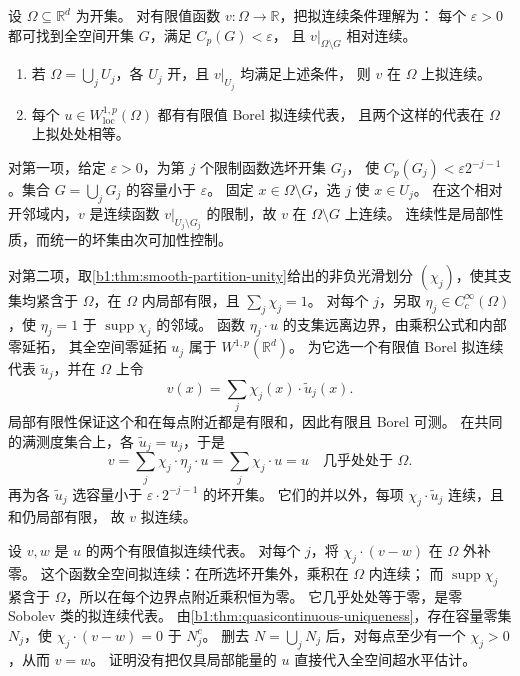 \begin{exercise}\label{b1:ex:26-local-quasicontinuous-gluing}
设 \(\Omega\subseteq\mathbb R^d\) 为开集。
对有限值函数 \(v\colon\Omega\rightarrow\mathbb R\)，把拟连续条件理解为：
每个 \(\varepsilon>0\) 都可找到全空间开集 \(G\)，满足 \(C_p(G)<\varepsilon\)，
且 \(v|_{\Omega\setminus G}\) 相对连续。
\begin{enumerate}
 \item\label{b1:item:26-local-quasicontinuous-cover}
 若 \(\Omega=\bigcup_jU_j\)，各 \(U_j\) 开，且 \(v|_{U_j}\) 均满足上述条件，
 则 \(v\) 在 \(\Omega\) 上拟连续。
 \item\label{b1:item:26-local-quasicontinuous-sobolev}
 每个 \(u\in W_{\mathrm{loc}}^{1,p}(\Omega)\) 都有有限值 Borel 拟连续代表，
 且两个这样的代表在 \(\Omega\) 上拟处处相等。
\end{enumerate}
\end{exercise}
\begin{solution}
对第一项，给定 \(\varepsilon>0\)，为第 \(j\) 个限制函数选坏开集 \(G_j\)，
使 \(C_p(G_j)<\varepsilon2^{-j-1}\)。集合 \(G=\bigcup_jG_j\) 的容量小于 \(\varepsilon\)。
固定 \(x\in\Omega\setminus G\)，选 \(j\) 使 \(x\in U_j\)。
在这个相对开邻域内，\(v\) 是连续函数
\(v|_{U_j\setminus G_j}\) 的限制，故 \(v\) 在 \(\Omega\setminus G\) 上连续。
连续性是局部性质，而统一的坏集由次可加性控制。

对第二项，取\cref{b1:thm:smooth-partition-unity}给出的非负光滑划分
\((\chi_j)\)，使其支集均紧含于 \(\Omega\)，在 \(\Omega\) 内局部有限，且
\(\sum_j\chi_j=1\)。
对每个 \(j\)，另取 \(\eta_j\in C_c^\infty(\Omega)\)，使
\(\eta_j=1\) 于 \(\operatorname{supp}\chi_j\) 的邻域。
函数 \(\eta_j\cdot u\) 的支集远离边界，由乘积公式和内部零延拓，
其全空间零延拓 \(u_j\) 属于 \(W^{1,p}(\mathbb R^d)\)。
为它选一个有限值 Borel 拟连续代表 \(\widetilde u_j\)，并在 \(\Omega\) 上令
\[
 v(x)=\sum_j\chi_j(x)\cdot\widetilde u_j(x).
\]
局部有限性保证这个和在每点附近都是有限和，因此有限且 Borel 可测。
在共同的满测度集合上，各 \(\widetilde u_j=u_j\)，于是
\[
 v=\sum_j\chi_j\cdot\eta_j\cdot u=\sum_j\chi_j\cdot u=u
 \quad\text{几乎处处于 }\Omega.
\]
再为各 \(\widetilde u_j\) 选容量小于 \(\varepsilon\cdot2^{-j-1}\) 的坏开集。
它们的并以外，每项 \(\chi_j\cdot\widetilde u_j\) 连续，且和仍局部有限，
故 \(v\) 拟连续。

设 \(v,w\) 是 \(u\) 的两个有限值拟连续代表。
对每个 \(j\)，将 \(\chi_j\cdot(v-w)\) 在 \(\Omega\) 外补零。
这个函数全空间拟连续：在所选坏开集外，乘积在 \(\Omega\) 内连续；
而 \(\operatorname{supp}\chi_j\) 紧含于 \(\Omega\)，所以在每个边界点附近乘积恒为零。
它几乎处处等于零，是零 Sobolev 类的拟连续代表。
由\cref{b1:thm:quasicontinuous-uniqueness}，存在容量零集 \(N_j\)，使
\(\chi_j\cdot(v-w)=0\) 于 \(N_j^c\)。
删去 \(N=\bigcup_jN_j\) 后，对每点至少有一个 \(\chi_j>0\)，从而 \(v=w\)。
证明没有把仅具局部能量的 \(u\) 直接代入全空间超水平估计。
\end{solution}

